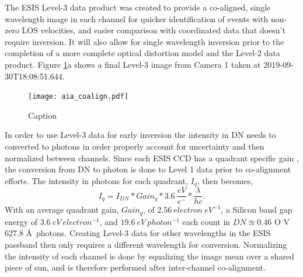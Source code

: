     
    	\newcommand{\vigfit}{[0.44, 0.34, 0.38, 0.5]}
    	\newcommand{\levthreetime}{2019-09-30T18:08:51.644}
    	
    	
    	The ESIS Level-3 data product was created to provide a co-aligned, single wavelength image in each channel for quicker identification of events with non-zero LOS velocities, and easier comparison with coordinated data that doesn't require inversion. 
    	It will also allow for single wavelength inversion prior to the completion of a more complete optical distortion model and the Level-2 data product.
    	Figure \ref{fig:coalign}a shows a final Level-3 image from Camera 1 taken at \levthreetime.
    	
  		\begin{figure}[htb!]
    		\centering
    		\texttt{[image: aia\_coalign.pdf]}
    		\caption{Caption}
    		\label{fig:coalign}
    	\end{figure}
    	
    
     	In order to use Level-3 data for early inversion the intensity in DN needs to  converted to photons in order properly account for uncertainty and then normalized between channels.
   		Since each ESIS CCD has a quadrant specific gain \citep{ESIS}, the conversion from DN to photon is done to Level 1 data prior to co-alignment efforts.
   		The intensity in photons for each quadrant, $I_q$, then becomes,
   		\begin{equation}
	   		I_q = I_{DN} * Gain_q * 3.6\ \frac{eV}{e^{-}} * \frac{\lambda}{hc}.
   		\end{equation}
   		With an average quadrant gain, $Gain_q$, of $2.56\ electron\ eV^{-1}$, a Silicon band gap energy of $3.6\ eV\ electron^{-1}$, and $19.6\ eV\ photon^{-1}$ each count in $DN \approxeq 0.46$ O V 627.8 \AA \ photons.
   		Creating Level-3 data for other wavelengths in the ESIS passband then only requires a different wavelength for conversion.
   		Normalizing the intensity of each channel is done by equalizing the image mean over a shared piece of sun, and is therefore performed after inter-channel co-alignment.
   		
